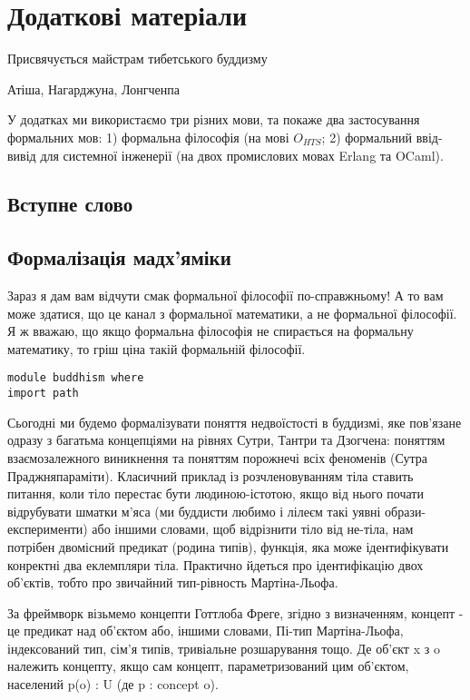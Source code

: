 \chapter{Додаткові матеріали}
\epigraph{Присвячується майстрам тибетського буддизму}{Атіша, Нагарджуна, Лонгченпа}

У додатках ми використаємо три різних мови, та покаже два застосування
формальних мов: 1) формальна філософія (на мові $O_{HTS}$; 2) формальний ввід-вивід для
системної інженерії (на двох промислових мовах Erlang та OCaml).

\section*{Вступне слово}

\section{Формалізація мадх'яміки}

Зараз я дам вам відчути смак формальної філософії по-справжньому!
А то вам може здатися, що це канал з формальної математики,
а не формальної філософії. Я ж вважаю, що якщо формальна
філософія не спирається на формальну математику, то гріш
ціна такій формальній філософії.

\begin{lstlisting}
module buddhism where
import path
\end{lstlisting}

Сьогодні ми будемо формалізувати поняття недвоїстості в буддизмі,
яке пов'язане одразу з багатьма концепціями на рівнях Сутри, Тантри та Дзогчена:
поняттям взаємозалежного виникнення та поняттям порожнечі всіх
феноменів (Сутра Праджняпараміти). Класичний приклад із розчленовуванням
тіла ставить питання, коли тіло перестає бути людиною-істотою, якщо
від нього почати відрубувати шматки м'яса (ми буддисти любимо і
лілеєм такі уявні образи-експерименти) або іншими словами, щоб відрізнити
тіло від не-тіла, нам потрібен двомісний предикат (родина типів),
функція, яка може ідентифікувати конректні два еклемпляри тіла.
Практично йдеться про ідентифікацію двох об'єктів, тобто про звичайний
тип-рівность Мартіна-Льофа.

За фреймворк візьмемо концепти Готтлоба Фреге, згідно з визначенням,
концепт - це предикат над об'єктом або, іншими словами, Пі-тип Мартіна-Льофа,
індексований тип, сім'я типів, тривіальне розшарування тощо. Де об'єкт
x з o належить концепту, якщо сам концепт, параметризований цим об'єктом,
населений p(o) : U (де p : concept o).

